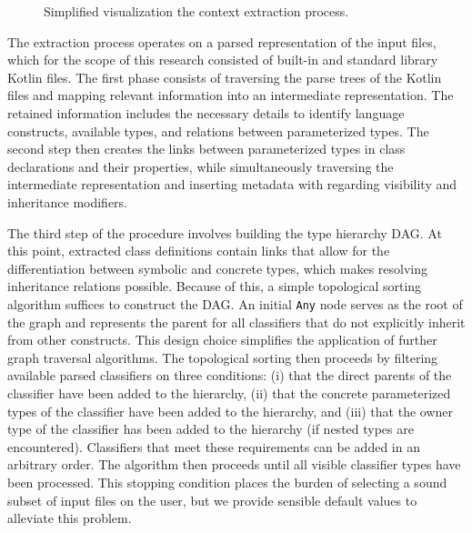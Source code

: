 \begin{figure*}[!hbtp]
\begin{minipage}[t]{-4\linewidth}
\end{minipage}
\vspace{3.5cm}
\caption{Simplified visualization the context extraction process.}
\label{fig:context-extraction}
\end{figure*}

The extraction process operates on a parsed representation of the input
files, which for the scope of this research consisted of built-in and standard library 
Kotlin files.
The first phase consists of traversing the parse trees of the Kotlin files and mapping
relevant information into an intermediate representation.
The retained information includes the necessary details to identify language constructs,
available types, and relations between parameterized types.
The second step then creates the links between 
parameterized types in class declarations and their properties, while simultaneously
traversing the intermediate representation and inserting metadata with regarding
visibility and inheritance modifiers.

The third step of the procedure involves building the type hierarchy \Gls{DAG}.
At this point, extracted class definitions contain links that allow for the
differentiation between symbolic and concrete types, which makes resolving
inheritance relations possible.
Because of this, a simple topological sorting algorithm suffices to construct the \Gls{DAG}.
An initial \texttt{Any} node serves as the root of the graph
and represents the parent for all classifiers
that do not explicitly inherit from other constructs.
This design choice simplifies the application of further graph traversal algorithms.
The topological sorting then proceeds by filtering available parsed classifiers on three conditions: (i) that the direct parents of the classifier have been added to the hierarchy, (ii) that the concrete parameterized types of the classifier have been added to the hierarchy, and (iii) that the owner
type of the classifier has been added to the hierarchy (if nested types are encountered).
Classifiers that meet these requirements can be added in an arbitrary order.
The algorithm then proceeds until all visible classifier types have been processed.
This stopping condition places the burden of selecting a sound
subset of input files on the user, but we provide sensible
default values to alleviate this problem.


